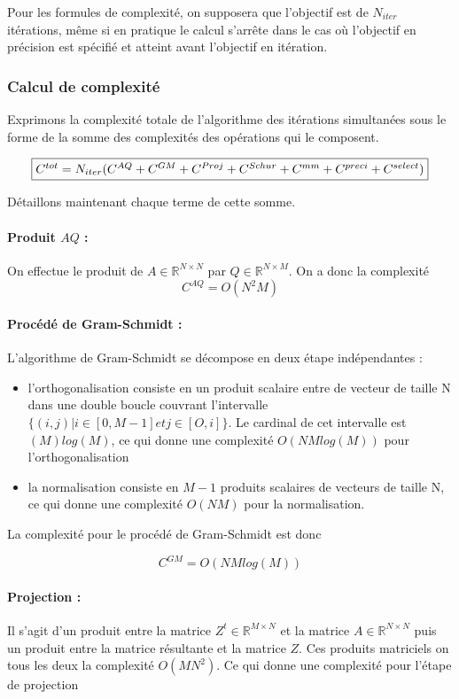 \documentclass[11pt,a4paper]{article}
\begin{document}
			Pour les formules de complexité, on supposera que l'objectif est de $N_{iter}$ itérations, même si en pratique le calcul s'arrête dans le cas où l'objectif en précision est spécifié et atteint avant l'objectif en itération.

		\subsubsection{Calcul de complexité}

			Exprimons la complexité totale de l'algorithme des itérations simultanées sous le forme de la somme des complexités des opérations qui le composent.

			$$
			\fbox{$C^{tot} = N_{iter} (C^{AQ} + C^{GM} + C^{Proj} + C^{Schur} + C^{mm} + C^{preci} + C^{select})$}
			$$

			Détaillons maintenant chaque terme de cette somme.

			\paragraph{Produit $AQ$ :} On effectue le produit de $A \in \mathbb{R}^{N\times N}$ par $Q \in \mathbb{R}^{N \times M}$. On a donc la complexité
			$$C^{AQ} = O(N^2M)$$

			\paragraph{Procédé de Gram-Schmidt :} L'algorithme de Gram-Schmidt se décompose en deux étape indépendantes :
			\begin{itemize}
				\item l'orthogonalisation consiste en un produit scalaire entre de vecteur de taille N dans une double boucle couvrant l'intervalle $\{(i,j) | i \in [0,M-1] et j \in [O,i]\}$. Le cardinal de cet intervalle est $(M)log(M)$, ce qui donne une complexité $O(NMlog(M))$ pour l'orthogonalisation
				\item la normalisation consiste en $M-1$ produits scalaires de vecteurs de taille N, ce qui donne une complexité $O(NM)$ pour la normalisation.
			\end{itemize}		
			La complexité pour le procédé de Gram-Schmidt est donc
			
			$$C^{GM} = O(NMlog(M))$$

			\paragraph{Projection :} Il s'agit d'un produit entre la matrice $Z^t \in \mathbb{R}^{M\times N}$ et la matrice $A \in \mathbb{R}^{N\times N}$ puis un produit entre la matrice résultante et la matrice $Z$. Ces produits matriciels on tous les deux la complexité $O(MN^2)$. Ce qui donne une complexité pour l'étape de projection
			
\end{document}
